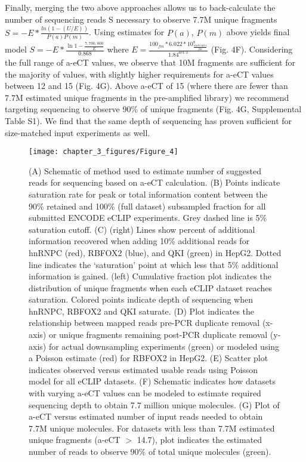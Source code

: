 Finally, merging the two above approaches allows us to back-calculate the number of sequencing reads S necessary to observe 7.7M unique fragments
$S=-E*\frac{ln(1-(U/E))}{P(a)P(m)}$. Using estimates for $P(a)$, $P(m)$ above yields final model $S=-E*\frac{\ln{1-\frac{7,700,000}{E}}}{0.868}$ where $E=\frac{100_{fm}*6.022*10^8_{\frac{molecules}{fm}}}{1.84^{aeCT}}$  (Fig. 4F). Considering the full range of a-eCT values, we observe that 10M fragments are sufficient for the majority of values, with slightly higher requirements for a-eCT values between 12 and 15 (Fig. 4G). Above a-eCT of 15 (where there are fewer than 7.7M estimated unique fragments in the pre-amplified library) we recommend targeting sequencing to observe 90\% of unique fragments (Fig. 4G, Supplemental Table S1). We find that the same depth of sequencing has proven sufficient for size-matched input experiments as well.


\begin{figure}[ht]
  \centering
  \texttt{[image: chapter\_3\_figures/Figure\_4]}
  \caption[Figure 4. eCLIP Sequencing Depth Recommendations]{(A) Schematic of method used to estimate number of suggested reads for sequencing based on a-eCT calculation. (B) Points indicate saturation rate for peak or total information content between the 90\% retained and 100\% (full dataset) subsampled fraction for all submitted ENCODE eCLIP experiments. Grey dashed line is 5\% saturation cutoff. (C) (right) Lines show percent of additional information recovered when adding 10\% additional reads for hnRNPC (red), RBFOX2 (blue), and QKI (green) in HepG2. Dotted line indicates the ‘saturation’ point at which less that 5\% additional information is gained. (left) Cumulative fraction plot indicates the distribution of unique fragments when each eCLIP dataset reaches saturation. Colored points indicate depth of sequencing when hnRNPC, RBFOX2 and QKI saturate. (D) Plot indicates the relationship between mapped reads pre-PCR duplicate removal (x-axis) or unique fragments remaining post-PCR duplicate removal (y-axis) for actual downsampling experiments (green) or modeled using a Poisson estimate (red) for RBFOX2 in HepG2. (E) Scatter plot indicates observed versus estimated usable reads using Poisson model for all eCLIP datasets. (F) Schematic indicates how datasets with varying a-eCT values can be modeled to estimate required sequencing depth to obtain 7.7 million unique molecules. (G) Plot of a-eCT versus estimated number of input reads needed to obtain 7.7M unique molecules. For datasets with less than 7.7M estimated unique fragments (a-eCT $>$ 14.7), plot indicates the estimated number of reads to observe 90\% of total unique molecules (green). }
  \label{fig:Figure_4}
\end{figure}

